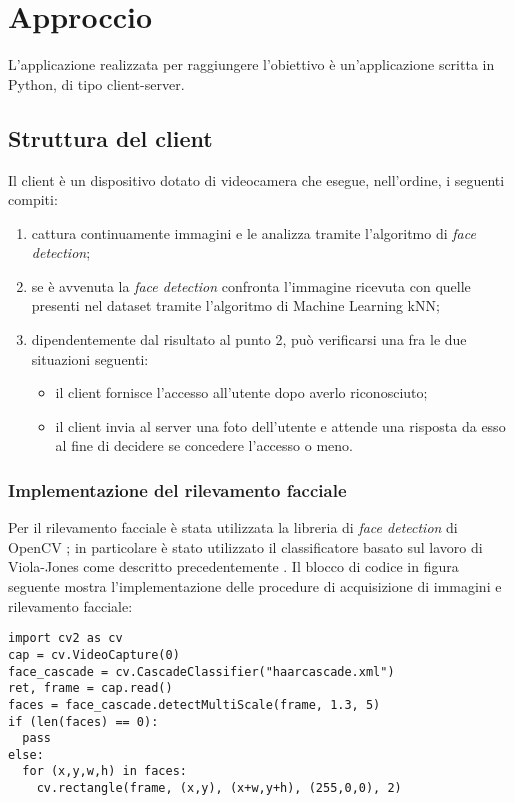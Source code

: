 \chapter{Approccio}
L'applicazione realizzata per raggiungere l'obiettivo è un'applicazione scritta in Python, di tipo client-server. 
\section{Struttura del client}
Il client è un dispositivo dotato di videocamera che esegue, nell'ordine, i seguenti compiti:
\begin{enumerate} 
	\item cattura continuamente immagini e le analizza tramite l'algoritmo di \textit{face detection};
	\item se è avvenuta la \textit{face detection} confronta l'immagine ricevuta con quelle presenti nel dataset tramite l'algoritmo di Machine Learning kNN;
	\item dipendentemente dal risultato al punto 2, può verificarsi una fra le due situazioni seguenti:
	\begin{itemize}
		\item il client fornisce l'accesso all'utente dopo averlo riconosciuto;
		\item il client invia al server una foto dell'utente e attende una risposta da esso al fine di decidere se concedere l'accesso o meno.
	\end{itemize}
	
\end{enumerate} 

\subsection{Implementazione del rilevamento facciale}
Per il rilevamento facciale è stata utilizzata la libreria di \textit{face detection} di OpenCV \cite{opencv_library}; in particolare è stato utilizzato il classificatore basato sul lavoro di Viola-Jones come descritto precedentemente \cite{viola2001rapid}. Il blocco di codice in figura seguente mostra l'implementazione delle procedure di acquisizione di immagini e rilevamento facciale:


\begin{lstlisting}
import cv2 as cv
cap = cv.VideoCapture(0)
face_cascade = cv.CascadeClassifier("haarcascade.xml")
ret, frame = cap.read()
faces = face_cascade.detectMultiScale(frame, 1.3, 5)
if (len(faces) == 0):
  pass
else:
  for (x,y,w,h) in faces:
    cv.rectangle(frame, (x,y), (x+w,y+h), (255,0,0), 2)
\end{lstlisting}


